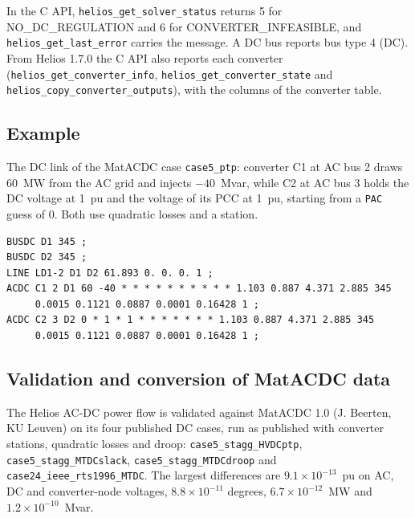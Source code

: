 In the C API, {\tt helios\_get\_solver\_status} returns 5 for NO\_DC\_REGULATION and 6 for CONVERTER\_INFEASIBLE, and {\tt helios\_get\_last\_error} carries the message. A DC bus reports bus type 4 (DC). From Helios 1.7.0 the C API also reports each converter ({\tt helios\_get\_converter\_info}, {\tt helios\_get\_converter\_state} and {\tt helios\_copy\_converter\_outputs}), with the columns of the converter table.

\subsection{Example}

The DC link of the MatACDC case {\tt case5\_ptp}: converter C1 at AC bus 2 draws 60~MW from the AC grid and injects $-40$~Mvar, while C2 at AC bus 3 holds the DC voltage at 1~pu and the voltage of its PCC at 1~pu, starting from a {\tt PAC} guess of 0. Both use quadratic losses and a station.

{\small
\begin{verbatim}
BUSDC D1 345 ;
BUSDC D2 345 ;
LINE LD1-2 D1 D2 61.893 0. 0. 0. 1 ;
ACDC C1 2 D1 60 -40 * * * * * * * * * * 1.103 0.887 4.371 2.885 345
     0.0015 0.1121 0.0887 0.0001 0.16428 1 ;
ACDC C2 3 D2 0 * 1 * 1 * * * * * * * 1.103 0.887 4.371 2.885 345
     0.0015 0.1121 0.0887 0.0001 0.16428 1 ;
\end{verbatim}
}

\subsection{Validation and conversion of MatACDC data}

The Helios AC-DC power flow is validated against MatACDC 1.0 (J. Beerten, KU Leuven) on its four published DC cases, run as published with converter stations, quadratic losses and droop: {\tt case5\_stagg\_HVDCptp}, {\tt case5\_stagg\_MTDCslack}, {\tt case5\_stagg\_MTDCdroop} and {\tt case24\_ieee\_rts1996\_MTDC}. The largest differences are $9.1\times10^{-13}$~pu on AC, DC and converter-node voltages, $8.8\times10^{-11}$ degrees, $6.7\times10^{-12}$~MW and $1.2\times10^{-10}$~Mvar.

